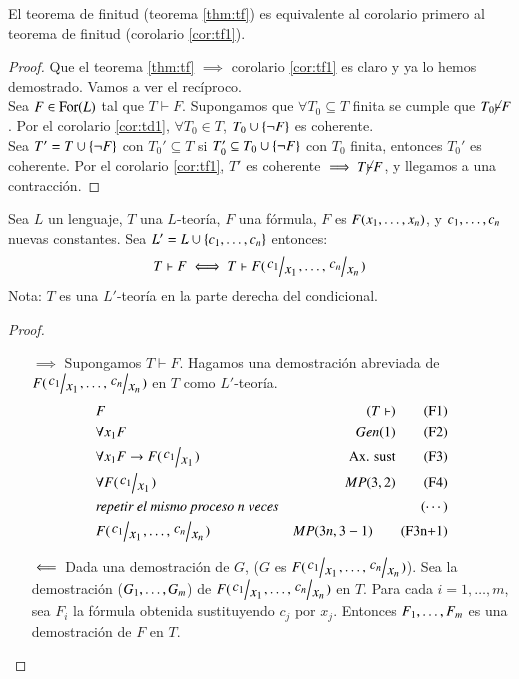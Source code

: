 \begin{cor}
    El teorema de finitud (teorema \ref{thm:tf}) es equivalente al corolario primero al teorema de finitud (corolario \ref{cor:tf1}).
\end{cor}
\begin{proof}
    Que el teorema \ref{thm:tf} $\implies$ corolario \ref{cor:tf1} es claro y ya lo hemos demostrado. Vamos a ver el recíproco.\\
    Sea $F \in \mathrm{For}(L)$ tal que $T \vdash F$. Supongamos que $\forall T_0 \subseteq T$ finita se cumple que $T_0 \cancel{\vdash} F$. Por el corolario \ref{cor:td1}, $\forall T_0 \in T$, $T_0 \cup \left\{\neg F\right\}$ es coherente.\\
    Sea $T' = T \cup \left\{\neg F\right\}$ con $T_0' \subseteq T$ si $T_0' \subseteq T_0 \cup \left\{\neg F\right\}$ con $T_0$ finita, entonces $T_0'$ es coherente. Por el corolario \ref{cor:tf1}, $T'$ es coherente $\implies T \cancel{\vdash} F$, y llegamos a una contracción.
\end{proof}

\begin{pro}\label{pro:2.3}
    Sea $L$ un lenguaje, $T$ una $L$-teoría, $F$ una fórmula, $F$ es $F({x}_{1}, \ldots, {x}_{n})$, y ${c}_{1}, \ldots, {c}_{n}$ nuevas constantes. Sea $L' = L \cup \left\{{c}_{1}, \ldots, {c}_{n}\right\}$ entonces:
    $$
        T \vdash F \iff T \vdash F (\quo{c_1}{x_1}, \ldots, \quo{c_n}{x_n})
    $$
    Nota: $T$ es una $L'$-teoría en la parte derecha del condicional.
\end{pro}

\begin{proof}$ $
    \begin{itemize}
        \item[$\implies$] Supongamos $T \vdash F$. Hagamos una demostración abreviada de $ F (\quo{c_1}{x_1}, \ldots, \quo{c_n}{x_n}) $ en $T$ como $L'$-teoría.
        \begin{align}
            &F\ &(T\vdash) \tag{F1}\\
            &\forall x_1 F\ &Gen(1) \tag{F2}\\
            &\forall x_1 F \then F(\quo{c_1}{x_1})\ &\text{Ax. sust} \tag{F3}\\
            &\forall F(\quo{c_1}{x_1})\ &MP(3, 2) \tag{F4}\\
            &\textit{repetir el mismo proceso n veces} & \tag{$\cdots$}\\
            &F(\quo{c_1}{x_1}, \ldots, \quo{c_n}{x_n})\ &MP(3n, 3-1) \tag{F3n+1}
        \end{align}
        \item[$\ \Longleftarrow\ $] Dada una demostración de $G$, ($G$ es $F(\quo{c_1}{x_1}, \ldots, \quo{c_n}{x_n})$). Sea la demostración (${G}_{1}, \ldots, {G}_{m}$) de $F(\quo{c_1}{x_1}, \ldots, \quo{c_n}{x_n})$ en $T$. Para cada $i = 1,\ldots,m$, sea $F_i$ la fórmula obtenida sustituyendo $c_j$ por $x_j$.
        Entonces ${F}_{1}, \ldots, {F}_{m}$ es una demostración de $F$ en $T$.
    \end{itemize}
\end{proof}

